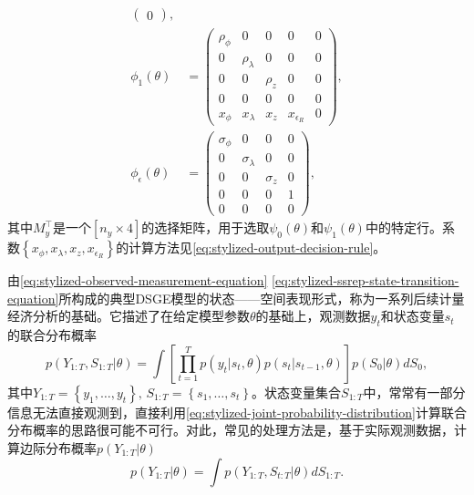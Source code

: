 \begin{equation*}
\begin{split}
\begin{pmatrix}
      0
    \end{pmatrix}, \\
    \phi_{1} \left( \theta \right) & =
    \begin{pmatrix}
      \rho_{\phi} & 0 & 0 & 0 & 0 \\
      0 & \rho_{\lambda} & 0 & 0 & 0 \\
      0 & 0 & \rho_{z} & 0 & 0 \\
      0 & 0 & 0 & 0 & 0 \\
      x_{\phi} & x_{\lambda} & x_{z} & x_{\epsilon_{R}} & 0
    \end{pmatrix}, \\
    \phi_{\epsilon} \left( \theta \right) & =
    \begin{pmatrix}
      \sigma_{\phi} & 0 & 0 & 0 \\
      0 & \sigma_{\lambda} & 0 & 0 \\
      0 & 0 & \sigma_{z} & 0 \\
      0 & 0 & 0 & 1 \\
      0 & 0 & 0 & 0
    \end{pmatrix},
  \end{split}
\end{equation*}
其中$M_{y}^{\top}$是一个$\left[ n_{y} \times 4 \right]$的选择矩阵，用于选取$\psi_{0}\left( \theta \right)$和$\psi_{1}\left( \theta \right)$中的特定行。系数$\left\{ x_{\phi}, x_{\lambda}, x_{z}, x_{\epsilon_{R}} \right\}$的计算方法见\eqref{eq:stylized-output-decision-rule}。

由\eqref{eq:stylized-observed-measurement-equation} \eqref{eq:stylized-ssrep-state-transition-equation}所构成的典型DSGE模型的状态——空间表现形式，称为一系列后续计量经济分析的基础。它描述了在给定模型参数$\theta$的基础上，观测数据$y_{t}$和状态变量$s_{t}$的联合分布概率
\begin{equation}
  \label{eq:stylized-joint-probability-distribution}
  p \left( Y_{1:T}, S_{1:T}  | \theta \right)
  = \int
  \left[
  \prod_{t=1}^{T} p \left(y_{t} | s_{t}, \theta \right) p \left( s_{t} | s_{t-1}, \theta \right)
  \right] p  \left( S_{0} | \theta  \right) d S_{0} ,
\end{equation}
其中$Y_{1:T} = \left\{ y_{1}, \ldots, y_{t} \right\}, \, S_{1:T} = \left\{ s_{1}, \ldots, s_{t} \right\}$。状态变量集合$S_{1:T}$中，常常有一部分信息无法直接观测到，直接利用\eqref{eq:stylized-joint-probability-distribution}计算联合分布概率的思路很可能不可行。对此，常见的处理方法是，基于实际观测数据，计算边际分布概率$p \left( Y_{1:T} | \theta \right)$
\begin{equation}
  \label{eq:stylized-marginal-probability-distribution}
  p \left( Y_{1:T} | \theta \right) = \int p \left( Y_{1:T}, S_{t:T} | \theta \right) d S_{1:T}.
\end{equation}

